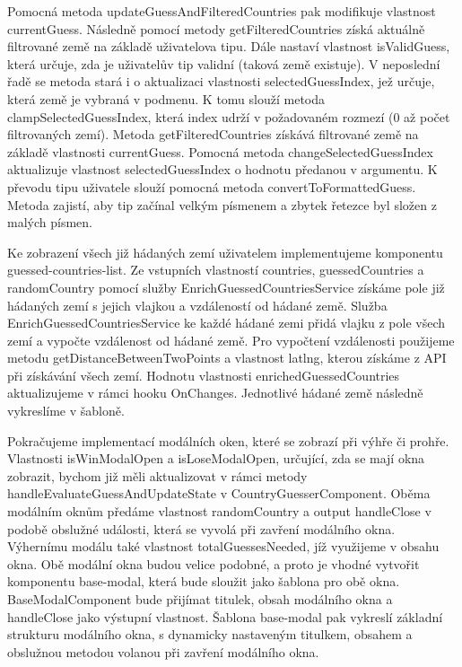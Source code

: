 Pomocná metoda updateGuessAndFilteredCountries pak modifikuje vlastnost currentGuess. 
Následně pomocí metody getFilteredCountries získá aktuálně filtrované země na základě uživatelova tipu. 
Dále nastaví vlastnost isValidGuess, která určuje, zda je uživatelův tip validní (taková země existuje). 
V neposlední řadě se metoda stará i o aktualizaci vlastnosti selectedGuessIndex, jež určuje, která země je vybraná v podmenu. 
K tomu slouží metoda clampSelectedGuessIndex, která index udrží v požadovaném rozmezí (0 až počet filtrovaných zemí).
Metoda getFilteredCountries získává filtrované země na základě vlastnosti currentGuess. 
Pomocná metoda changeSelectedGuessIndex aktualizuje vlastnost selectedGuessIndex o hodnotu předanou v argumentu. 
K převodu tipu uživatele slouží pomocná metoda convertToFormattedGuess. Metoda zajistí, aby tip začínal velkým písmenem a zbytek řetezce byl složen z malých písmen.

Ke zobrazení všech již hádaných zemí uživatelem implementujeme komponentu guessed-countries-list. 
Ze vstupních vlastností countries, guessedCountries a randomCountry pomocí služby EnrichGuessedCountriesService získáme pole již hádaných zemí s jejich vlajkou a vzdáleností od hádané země.
Služba EnrichGuessedCountriesService ke každé hádané zemi přidá vlajku z pole všech zemí a vypočte vzdálenost od hádané země. 
Pro vypočtení vzdálenosti použijeme metodu getDistanceBetweenTwoPoints a vlastnost latlng, kterou získáme z API při získávání všech zemí.
Hodnotu vlastnosti enrichedGuessedCountries aktualizujeme v rámci hooku OnChanges. Jednotlivé hádané země následně vykreslíme v šabloně.

Pokračujeme implementací modálních oken, které se zobrazí při výhře či prohře. 
Vlastnosti isWinModalOpen a isLoseModalOpen, určující, zda se mají okna zobrazit, bychom již měli aktualizovat v rámci metody handleEvaluateGuessAndUpdateState v CountryGuesserComponent. 
Oběma modálním oknům předáme vlastnost randomCountry a output handleClose v podobě obslužné události, která se vyvolá při zavření modálního okna. 
Výhernímu modálu také vlastnost totalGuessesNeeded, jíž využijeme v obsahu okna. 
Obě modální okna budou velice podobné, a proto je vhodné vytvořit komponentu base-modal, která bude sloužit jako šablona pro obě okna. 
BaseModalComponent bude přijímat titulek, obsah modálního okna a handleClose jako výstupní vlastnost. 
Šablona base-modal pak vykreslí základní strukturu modálního okna, s dynamicky nastaveným titulkem, obsahem a obslužnou metodou volanou při zavření modálního okna.

